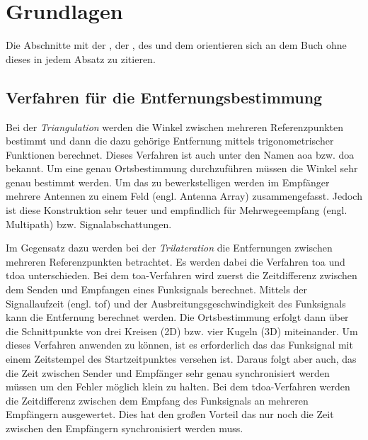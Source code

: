 %
%
%	
%
\chapter{Grundlagen}

Die Abschnitte mit der , der , des  und dem  orientieren sich an dem Buch  \cite{thrun2005probabilistic} ohne dieses in jedem Absatz zu zitieren.


%
%
\section{Verfahren für die Entfernungsbestimmung}

Bei der \textit{Triangulation} werden die Winkel zwischen mehreren Referenzpunkten bestimmt und dann die dazu gehörige Entfernung mittels trigonometrischer Funktionen berechnet. Dieses Verfahren ist auch unter den Namen \Gls{aoa} bzw. \Gls{doa} bekannt. Um eine genau Ortsbestimmung durchzuführen müssen die Winkel sehr genau bestimmt werden. Um das zu bewerkstelligen werden im Empfänger mehrere Antennen zu einem Feld (engl. Antenna Array) zusammengefasst. Jedoch ist diese Konstruktion sehr teuer und empfindlich für Mehrwegeempfang (engl. Multipath) bzw. Signalabschattungen. \cite{gezici2005localization, liu2007survey, decawave2014rtls}

Im Gegensatz dazu werden bei der \textit{Trilateration} die Entfernungen zwischen mehreren Referenzpunkten betrachtet. Es werden dabei die Verfahren \Gls{toa} und \Gls{tdoa} unterschieden.
Bei dem \Gls{toa}-Verfahren wird zuerst die Zeitdifferenz zwischen dem Senden und Empfangen eines Funksignals berechnet. Mittels der Signallaufzeit (engl. \acrfull{tof}) und der Ausbreitungsgeschwindigkeit des Funksignals kann die Entfernung berechnet werden. Die Ortsbestimmung erfolgt dann über die Schnittpunkte von drei Kreisen (2D) bzw. vier Kugeln (3D) miteinander. Um dieses Verfahren anwenden zu können, ist es erforderlich das das Funksignal mit einem Zeitstempel des Startzeitpunktes versehen ist. Daraus folgt aber auch, das die Zeit zwischen Sender und Empfänger sehr genau synchronisiert werden müssen um den Fehler möglich klein zu halten.
Bei dem \Gls{tdoa}-Verfahren werden die Zeitdifferenz zwischen dem Empfang des Funksignals an mehreren Empfängern ausgewertet. Dies hat den großen Vorteil das nur noch die Zeit zwischen den Empfängern synchronisiert werden muss. \cite{zekavat2011handbook, decawave2014rtls}

